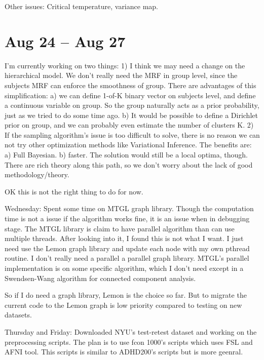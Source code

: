 \documentclass[12pt]{article}
\begin{document}
Other issues: Critical temperature,  variance map.

\section{Aug 24 -- Aug 27}
I'm currently working on two things: 1) I think we may need a change on the
hierarchical model. We don't really need the MRF in group level, since the
subjects MRF can enforce the smoothness of group. There are advantages of this
simplification: a) we can define 1-of-K binary vector on subjects level, and
define a continuous variable on group. So the group naturally acts as a prior
probability, just as we tried to do some time ago. b) It would be possible to
define a Dirichlet prior on group, and we can probably even estimate the number
of clusters K. 2) If the sampling algorithm's issue is too difficult to solve,
there is no reason we can not try other optimization methods like Variational
Inference. The benefits are: a) Full Bayesian. b) faster. The solution would
still be a local optima, though. There are rich theory along this path, so we
don't worry about the lack of good methodology/theory.

OK this is not the right thing to do for now. 

Wednesday: Spent some time on MTGL graph library. Though the computation time is
not a issue if the algorithm works fine, it is an issue when in debugging
stage. The MTGL library is claim to have parallel algorithm than can use
multiple threads. After looking into it, I found this is not what I want. I just
need use the Lemon graph library and update each node with my own pthread
routine. I don't really need a parallel a parallel graph library. MTGL's
parallel implementation is on some specific algorithm, which I don't need except
in a Swendsen-Wang algorithm for connected component analysis.

So if I do need a graph library, Lemon is the choice so far. But to migrate the
current code to the Lemon graph is low priority compared to testing on new
datasets.

Thursday and Friday: Downloaded NYU's test-retest dataset and working on the
preprocessing scripts. The plan is to use fcon 1000's scripts which uses FSL and
AFNI tool. This scripts is similar to ADHD200's scripts but is more geenral.
\end{document}
